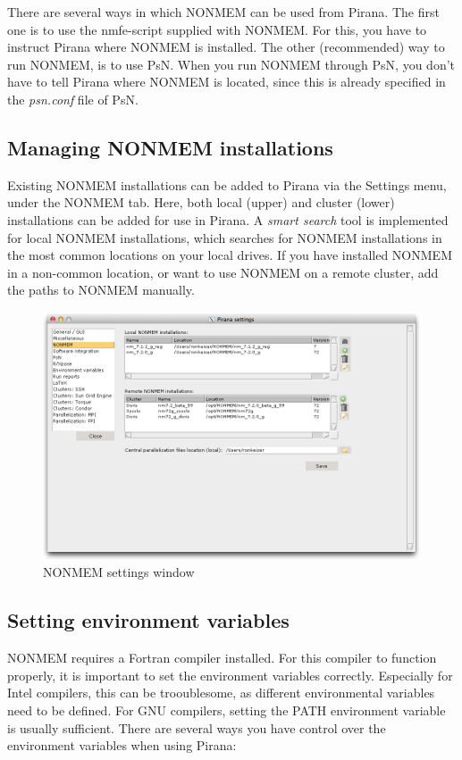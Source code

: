{{There are several ways in which NONMEM can be used from Pirana. The
first one is to use the nmfe-script supplied with NONMEM. For this,
you have to instruct Pirana where NONMEM is installed. The other
(recommended) way to run NONMEM, is to use PsN. When you run NONMEM
through PsN, you don't have to tell Pirana where NONMEM is located,
since this is already specified in the \textit{psn.conf} file of PsN.

\subsection{Managing NONMEM installations} Existing NONMEM
installations can be added to Pirana via the Settings menu, under the
NONMEM tab. Here, both local (upper) and cluster (lower) installations
can be added for use in Pirana. A \textit{smart search} tool is implemented
for local NONMEM installations, which searches for NONMEM
installations in the most common locations on your local drives. If
you have installed NONMEM in a non-common location, or want to use
NONMEM on a remote cluster, add the paths to NONMEM manually.

\begin{figure}[H] \centering
    \includegraphics[scale=0.31]{images/nonmem_settings.png}
    \caption{NONMEM settings window}
\end{figure}

\subsection{Setting environment variables}
NONMEM requires a Fortran compiler installed. For
this compiler to function properly, it is important to set the
environment variables correctly. Especially for Intel compilers, this
can be trooublesome, as different environmental variables need to be
defined. For GNU compilers, setting the PATH environment variable is
usually sufficient. There are several ways you have control over the
environment variables when using Pirana:

}}
